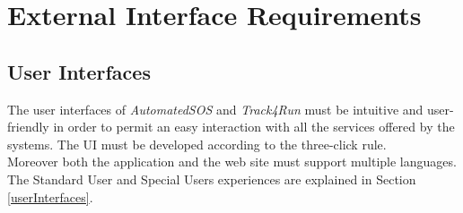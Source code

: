 \section{External Interface Requirements}

\subsection{User Interfaces}
The user interfaces of \textit{AutomatedSOS} and \textit{Track4Run} must be intuitive and user-friendly in order to permit an easy interaction with all the services offered by the systems. The UI must be developed according to the three-click rule.\\
Moreover both the application and the web site must support multiple languages.\\
The Standard User and Special Users experiences are explained in Section \ref{userInterfaces}.

